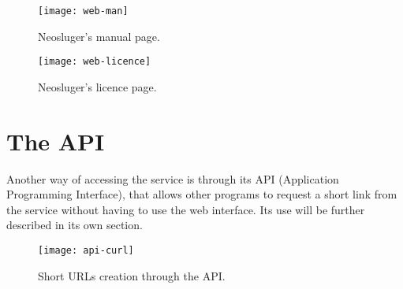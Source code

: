 \begin{figure}[ht!]
	\texttt{[image: web-man]}
	\caption{Neosluger's manual page.}
\end{figure}

\begin{figure}[ht!]
	\texttt{[image: web-licence]}
	\caption{Neosluger's licence page.}
\end{figure}


\section{The API}\label{the-api}

Another way of accessing the service is through its API (Application Programming Interface), that allows other programs to request a short link from the service without having to use the web interface.
Its use will be further described in its own section.
\begin{figure}[ht!]
	\texttt{[image: api-curl]}
	\caption{Short URLs creation through the API.}
\end{figure}
